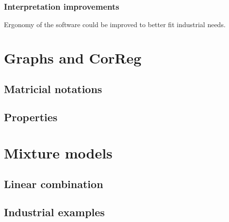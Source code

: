\documentclass[12pt,a4paper]{report}
\begin{document}
		\subsection{Interpretation improvements}
			Ergonomy of the software could be improved to better fit industrial needs.
\cleardoublepage



\appendix
	\chapter{Graphs and CorReg}
		\section{Matricial notations}
		\section{Properties}
	\chapter{Mixture models}
		\section{Linear combination}
			
		\section{Industrial examples}	
\end{document}
